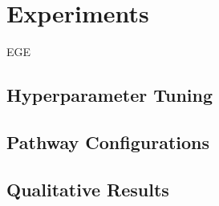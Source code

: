 \section{Experiments}
EGE
\subsection{Hyperparameter Tuning}


\subsection{Pathway Configurations}

\subsection{Qualitative Results}